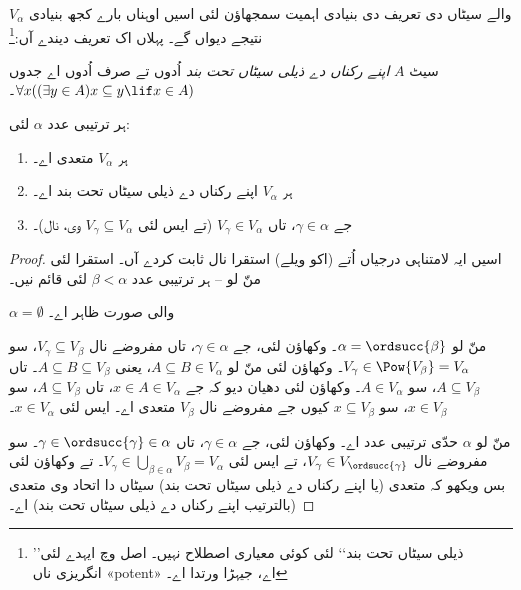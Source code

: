 \documentclass[../../../include/open-logic-section]{subfiles}
\begin{document}

$V_\alpha$ والے سیٹاں دی تعریف دی بنیادی اہمیت سمجھاؤن لئی اسیں اوہناں
بارے کجھ بنیادی نتیجے دیواں گے۔ پہلاں اک تعریف دیندے آں:\footnote{’’ذیلی
سیٹاں تحت بند‘‘ لئی کوئی معیاری اصطلاح نہیں۔ اصل وچ ایہدے لئی انگریزی ناں «potent» اے، جیہڑا
\citet{ButtonLT1} ورتدا اے۔}
\begin{defn}
سیٹ $A$ \emph{اپنے رکناں دے ذیلی سیٹاں تحت بند} اُدوں تے صرف اُدوں اے
جدوں $\forall x((\exists y \in A)x \subseteq y \lif x \in A)$۔
\end{defn}
\begin{lem}
ہر ترتیبی عدد $\alpha$ لئی:
\begin{enumerate}
	\item{} ہر $V_\alpha$ متعدی اے۔
	\item{} ہر $V_\alpha$ اپنے رکناں دے ذیلی سیٹاں تحت بند اے۔
	\item{} جے $\gamma \in \alpha$، تاں $V_\gamma
	\in V_\alpha$ (تے ایس لئی $V_\gamma \subseteq V_\alpha$ وی،
	 نال)۔
\end{enumerate}
\end{lem}

\begin{proof}
اسیں ایہ لامتناہی درجیاں اُتے (اکو ویلے) استقرا نال ثابت کردے آں۔
استقرا لئی منّ لو -- ہر ترتیبی
عدد $\beta < \alpha$ لئی قائم نیں۔

$\alpha = \emptyset$ والی صورت ظاہر اے۔

منّ لو $\alpha = \ordsucc{\beta}$۔  وکھاؤن لئی، جے
$\gamma \in \alpha$، تاں مفروضے نال $V_\gamma \subseteq V_\beta$،
سو $V_\gamma \in \Pow{V_\beta} = V_\alpha$۔
 وکھاؤن لئی منّ لو $A \subseteq B \in V_\alpha$،
یعنی $A \subseteq B \subseteq V_\beta$۔ تاں $A \subseteq V_\beta$،
سو $A \in V_\alpha$۔  وکھاؤن لئی دھیان دیو کہ
جے $x \in A \in V_\alpha$، تاں $A \subseteq V_\beta$، سو $x \in V_\beta$،
سو $x \subseteq V_\beta$ کیوں جے مفروضے نال $V_\beta$ متعدی اے۔
ایس لئی $x \in V_\alpha$۔

منّ لو $\alpha$ حدّی ترتیبی عدد اے۔  وکھاؤن لئی،
جے $\gamma \in \alpha$، تاں $\gamma \in \ordsucc{\gamma} \in \alpha$۔
سو مفروضے نال $V_\gamma \in V_{\ordsucc{\gamma}}$، تے ایس لئی
$V_\gamma \in \bigcup_{\beta \in \alpha} V_\beta = V_\alpha$۔
 تے  وکھاؤن لئی بس ویکھو کہ
متعدی (یا اپنے رکناں دے ذیلی سیٹاں تحت بند) سیٹاں دا اتحاد وی
متعدی (بالترتیب اپنے رکناں دے ذیلی سیٹاں تحت بند) اے۔
\end{proof}
\end{document}
